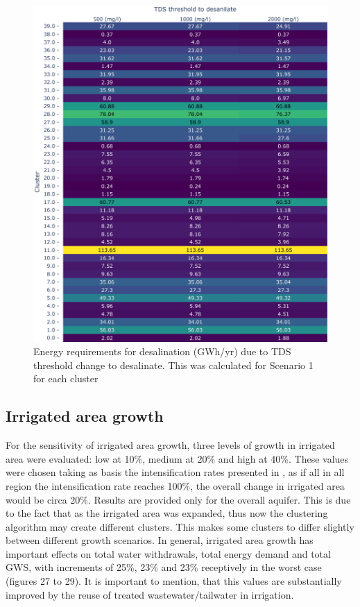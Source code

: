 \documentclass[12pt]{iopart}
\begin{document}
\begin{figure}[!h]
	\centering
	\includegraphics[width=\textwidth]{TDSSensitivityThresholdCluster}
	\caption{Energy requirements for desalination (GWh/yr) due to TDS threshold change to desalinate. This was calculated for Scenario 1 for each cluster}
	\label{fig:tdssensclusterthreshold}
\end{figure} 
\newpage

\subsection{Irrigated area growth}
For the sensitivity of irrigated area growth, three levels of growth in irrigated area were evaluated: low at 10\%, medium at 20\% and high at 40\%. These values were chosen taking as basis the intensification rates presented in , as if all in all region the intensification rate reaches 100\%, the overall change in irrigated area would be circa 20\%. Results are provided only for the overall aquifer. This is due to the fact that as the irrigated area was expanded, thus now the clustering algorithm may create different clusters. This makes some clusters to differ slightly between different growth scenarios. In general, irrigated area growth has important effects on total water withdrawals, total energy demand and total GWS, with increments of 25\%, 23\% and 23\% receptively in the worst case (figures 27 to 29). It is important to mention, that this values are substantially improved by the reuse of treated wastewater/tailwater in irrigation.
\end{document}
